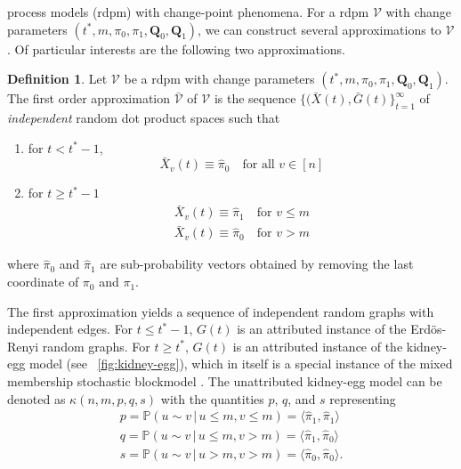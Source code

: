 \documentclass[10pt,journal,compsoc]{IEEEtran}
\theoremstyle{definition}
\newtheorem{definition}{Definition}
\begin{document}
process models (rdpm) with change-point phenomena. For a rdpm
$\mathscr{V}$ with change parameters $(t^{*}, m, \pi_0, \pi_1,
\mathbf{Q}_0, \mathbf{Q}_1)$, we can construct several approximations
to $\mathscr{V}$. Of particular interests are the following two
approximations.
\begin{definition}
  \label{def:1}
  Let $\mathscr{V}$ be a rdpm with change parameters $(t^{*}, m,
  \pi_0, \pi_1, \mathbf{Q}_0, \mathbf{Q}_1)$. The first order approximation
  $\bar{\mathscr{V}}$ of $\mathscr{V}$ is the sequence $\{(\bar{X}(t),
  \bar{G}(t)\}_{t = 1}^{\infty}$ of {\em independent} random dot product
  spaces such that
 \begin{enumerate}
 \item for $t < t^{*} - 1$,
   \begin{equation}
     \label{eq:5}
     \bar{X}_{v}(t)  \equiv \hat{\pi}_0 \quad \text{for all $v \in [n]$}
   \end{equation}
 \item for $t \geq t^{*} - 1$
   \begin{gather*}
     \bar{X}_{v}(t) \equiv \hat{\pi}_1 \quad \text{for $v \leq m$} \\
     \bar{X}_{v}(t) \equiv \hat{\pi}_0 \quad \text{for $v > m$} 
   \end{gather*}
 \end{enumerate}
 where $\hat{\pi}_0$ and $\hat{\pi}_1$ are sub-probability vectors
 obtained by removing the last coordinate of $\pi_0$ and $\pi_1$. 
\end{definition}
The first approximation yields a sequence of independent random graphs
with independent edges. For $t \leq t^{*} - 1$, $G(t)$ is an
attributed instance of the Erd\"{o}s-Renyi random graphs. For $t \geq
t^{*}$, $G(t)$ is an attributed instance of the kidney-egg model
\cite{rukhin11} (see \figurename~\ref{fig:kidney-egg}), which in
itself is a special instance of the mixed membership stochastic
blockmodel \cite{airoldi08:_mixed}. The unattributed kidney-egg model
can be denoted as $\kappa(n,m,p,q,s)$ with the quantities $p$, $q$,
and $s$ representing
\begin{gather*}
p = \mathbb{P}(u \sim v \, | \, u \leq m, v \leq m) = \langle
\hat{\pi}_1, \hat{\pi}_1 \rangle \\ q =
\mathbb{P}(u \sim v \, | \, u \leq m, v > m) = \langle \hat{\pi}_1,
\hat{\pi}_0 \rangle \\ s = \mathbb{P}(u
\sim v \, | \, u > m, v > m) = \langle \hat{\pi}_0, \hat{\pi}_0
\rangle . 
\end{gather*}
\end{document}
